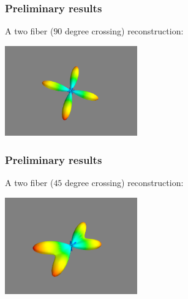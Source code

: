 \documentclass{beamer}
\begin{document}
  \frame
  {
  \frametitle{Preliminary results}
  A two fiber ($90$ degree crossing) reconstruction:
  \vspace{-0.1in}
  \begin{center}
    \includegraphics[width = 2.25in]{odf-2-90.png}
  \end{center}
  }
  \frame
  {
  \frametitle{Preliminary results}
  A two fiber ($45$ degree crossing) reconstruction:
  \vspace{-0.1in}
  \begin{center}
    \includegraphics[width = 2.25in]{odf-2-45.png}
  \end{center}
  }
\end{document}
